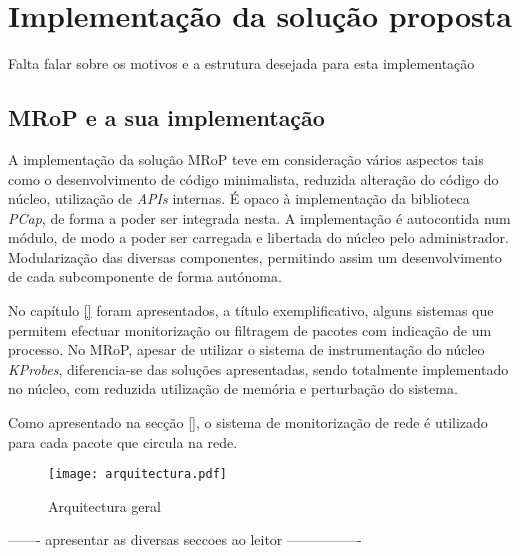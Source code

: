 \chapter{Implementação da solução proposta}
\label{cap:Implementacao}

Falta falar sobre os motivos e a estrutura desejada para esta implementação

\section{MRoP e a sua implementação}
\label{sec:mrop_implementation}

A implementação da solução MRoP teve em consideração vários aspectos tais como o desenvolvimento de código minimalista, reduzida alteração do código do núcleo, utilização de \textit{APIs} internas.
É opaco à implementação da biblioteca \textit{PCap}, de forma a poder ser integrada nesta.
A implementação é autocontida num módulo, de modo a poder ser carregada e libertada do núcleo pelo administrador.
Modularização das diversas componentes, permitindo assim um desenvolvimento de cada subcomponente de forma autónoma.

No capítulo \ref{} foram apresentados, a título exemplificativo, alguns sistemas que permitem efectuar monitorização ou filtragem de pacotes com indicação de um processo.
No MRoP, apesar de utilizar o sistema de instrumentação do núcleo \textit{KProbes}, diferencia-se das soluções apresentadas, sendo totalmente implementado no núcleo, com reduzida utilização de memória e perturbação do sistema.

Como apresentado na secção \ref{}, o sistema de monitorização de rede é utilizado para cada pacote que circula na rede.

\begin{figure}[ht]
\centering
\texttt{[image: arquitectura.pdf]}
\caption{Arquitectura geral}
\label{fig:general_architecture}
\end{figure}






------- apresentar as diversas seccoes ao leitor ----------------

